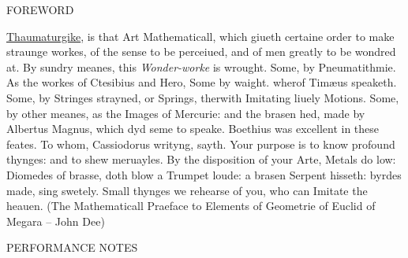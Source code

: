 \documentclass[11pt]{article}
\begin{document}
\begin{center}
\huge FOREWORD
\end{center}

\begingroup

\begin{center}
\underline{Thaumaturgike}, is that Art Mathematicall, which giueth certaine order
to make straunge workes, of the sense to be perceiued, and of men
greatly to be wondred at. By sundry meanes, this \textit{Wonder-worke} is
wrought. Some, by Pneumatithmie. As the workes of Ctesibius and
Hero, Some by waight. wherof Timæus speaketh. Some, by Stringes
strayned, or Springs, therwith Imitating liuely Motions. Some, by other
meanes, as the Images of Mercurie: and the brasen hed, made by Albertus
Magnus, which dyd seme to speake. Boethius was excellent in these
feates. To whom, Cassiodorus writyng, sayth. Your purpose is to know
profound thynges: and to shew meruayles. By the disposition of your
Arte, Metals do low: Diomedes of brasse, doth blow a Trumpet loude:
a brasen Serpent hisseth: byrdes made, sing swetely. Small thynges we
rehearse of you, who can Imitate the heauen.
\rightskip\leftskip
\phantom{text} \hfill (The Mathematicall Praeface to Elements of Geometrie of Euclid of Megara -- John Dee)
\end{center}

\endgroup


\begin{center}
\huge PERFORMANCE NOTES
\end{center}
\end{document}
